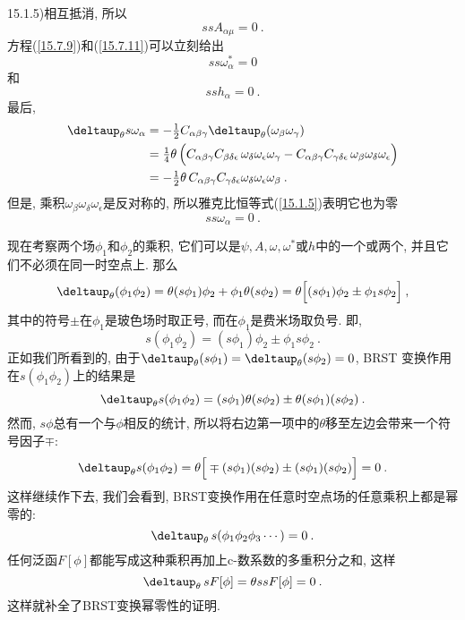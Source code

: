 {15.1.5})相互抵消, 所以
\begin{equation}
ssA_{\alpha \mu }=0\:.   \label{15.7.16}
\end{equation}%
方程(\ref{15.7.9})和(\ref{15.7.11})可以立刻给出\begin{equation}
ss\omega _{\alpha }^{\ast }=0  \label{15.7.17}
\end{equation}%
和\begin{equation}
ssh_{\alpha }=0\:.   \label{15.7.18}
\end{equation}%
最后,%
\begin{align*}
\deltaup_{\theta }s\omega _{\alpha } &=-\tfrac{1}{2}C_{\alpha \beta \gamma
}\deltaup_{\theta }(\omega _{\beta }\omega _{\gamma }) \\
&=\tfrac{1}{4}\theta \,\Big( C_{\alpha \beta \gamma }C_{\beta \delta \epsilon
}\,\omega _{\delta }\omega _{\epsilon }\omega _{\gamma }-C_{\alpha \beta
\gamma }C_{\gamma \delta \epsilon }\,\omega _{\beta }\omega _{\delta }\omega
_{\epsilon }\Big)  \\
&=-\tfrac{1}{2}\theta \,C_{\alpha \beta \gamma }C_{\gamma \delta \epsilon
}\omega _{\delta }\omega _{\epsilon }\omega _{\beta }\:. 
\end{align*}%
但是, 乘积$\omega _{\beta }\omega _{\delta }\omega_{\epsilon }$是反对称的, 所以雅克比恒等式(\ref{15.1.5})表明它也为零
\begin{equation}
ss\omega _{\alpha }=0\:.   \label{15.7.19}
\end{equation}

现在考察两个场$\phi _{1}$和$\phi _{2}$的乘积, 它们可以是$\psi ,A,\omega ,\omega ^{\ast }$或$h$中的一个或两个, 并且它们不必须在同一时空点上. 那么\[
\deltaup_{\theta }(\phi _{1}\phi _{2})=\theta (s\phi _{1})\phi _{2}+\phi
_{1}\theta (s\phi _{2})=\theta \Big[ (s\phi _{1})\phi _{2}\pm \phi
_{1}s\phi _{2}\Big] \:, 
\]%
其中的符号$\pm$在$\phi _{1}$是玻色场时取正号, 而在$\phi _{1}$是费米场取负号. 即,%
\[
s(\phi _{1}\phi _{2})=(s\phi _{1})\phi _{2}\pm \phi _{1}s\phi _{2}\:. 
\]%
正如我们所看到的, 由于$\deltaup_{\theta }(s\phi _{1})=\deltaup_{\theta }(s\phi _{2})=0$, BRST%
变换作用在$s(\phi _{1}\phi _{2})$上的结果是
\[
\deltaup_{\theta }s(\phi _{1}\phi _{2})=(s\phi _{1})\theta (s\phi _{2})\pm
\theta (s\phi _{1})(s\phi _{2})\:. 
\]%
然而, $s\phi$总有一个与$\phi$相反的统计, 所以将右边第一项中的$\theta$移至左边会带来一个符号因子$\mp $:%
\[
\deltaup_{\theta }s(\phi _{1}\phi _{2})=\theta \Big[ \mp (s\phi _{1})(s\phi
_{2})\pm (s\phi _{1})(s\phi _{2})\Big] =0\:. 
\]%
这样继续作下去, 我们会看到, BRST变换作用在任意时空点场的任意乘积上都是幂零的:%
\[
\deltaup_{\theta }\,s(\phi _{1}\phi _{2}\phi _{3}\cdots )=0\:. 
\]%
任何泛函$F[\phi ]$都能写成这种乘积再加上c-数系数的多重积分之和, 这样
\begin{equation}
\deltaup_{\theta }\,sF[\phi ]=\theta ssF[\phi ]=0\:.   \label{15.7.20}
\end{equation}%
这样就补全了BRST变换幂零性的证明.

